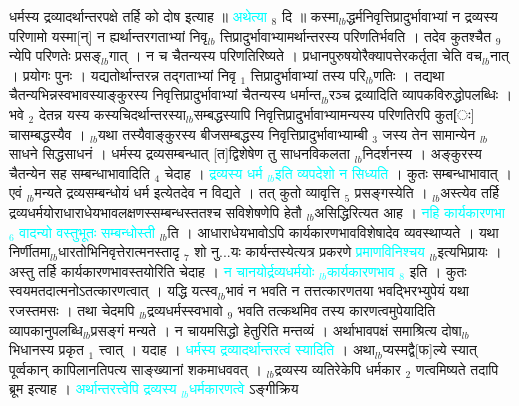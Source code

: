 \documentclass[article,12pt,a4paper]{memoir}%
\newcommand{\quotelemma}[1]{\textcolor{cyan}{#1}}
\begin{document}
	  
	  \pstart \leavevmode%
	\hphantom{.}धर्मस्य द्रव्यादर्थान्तरपक्षे तर्हि को दोष इत्याह ॥ \quotelemma{अथेत्या} \cite[5a9]{vn-msN} {\tiny $_{8}$} दि ॥ कस्मा{\tiny $_{lb}$}द्धर्मनिवृत्तिप्रादुर्भावाभ्यां न द्रव्यस्य परिणामो यस्मा[न्] न ह्यर्थान्तरगताभ्यां निवृ{\tiny $_{lb}$} \leavevmode{} त्तिप्रादुर्भावाभ्यामर्थान्तरस्य परिणतिर्भवति । तदेव कुतश्चैत {\tiny $_{9}$} \leavevmode{} न्येपि परिणतेः प्रसङ्{\tiny $_{lb}$}गात् । न च चैतन्यस्य परिणतिरिष्यते । प्रधानपुरुषयोरैक्यापत्तेरकर्तृता चेति वच{\tiny $_{lb}$}नात् । प्रयोगः पुनः । यद्यतोर्थान्तरन्न तद्गताभ्यां निवृ {\tiny $_{1}$} त्तिप्रादुर्भावाभ्यां तस्य परि{\tiny $_{lb}$}णतिः । तद्यथा चैतन्यभिन्नस्वभावस्याङ्कुरस्य निवृत्तिप्रादुर्भावाभ्यां चैतन्यस्य धर्मान्त{\tiny $_{lb}$}रञ्च द्रव्यादिति व्यापकविरुद्धोपलब्धिः । भवे {\tiny $_{2}$} देतन्न यस्य कस्यचिदर्थान्तरस्या{\tiny $_{lb}$}सम्बद्धस्यापि निवृत्तिप्रादुर्भावाभ्यामन्यस्य परिणतिरपि कुत[ः] चासम्बद्धस्यैव । {\tiny $_{lb}$}यथा तस्यैवाङ्कुरस्य बीजसम्बद्धस्य निवृत्तिप्रादुर्भावाभ्याम्बी {\tiny $_{3}$} जस्य तेन सामान्येन {\tiny $_{lb}$}साधने सिद्धसाधनं । धर्मस्य द्रव्यसम्बन्धात् [त]द्विशेषेण तु साधनविकलता {\tiny $_{lb}$}निदर्शनस्य । अङ्कुरस्य चैतन्येन सह सम्बन्धाभावादिति {\tiny $_{4}$} चेदाह । \quotelemma{द्रव्यस्य धर्म {\tiny $_{lb}$}इति \cite[5a10]{vn-msN} व्यपदेशो न सिध्यति} \cite[5a10]{vn-msN} । कुतः सम्बन्धाभावात् । एवं {\tiny $_{lb}$}मन्यते द्रव्यसम्बन्धोयं धर्म इत्येतदेव न विद्यते । तत् कुतो व्यावृत्ति {\tiny $_{5}$} प्रसङ्गस्येति । {\tiny $_{lb}$}अस्त्येव तर्हि द्रव्यधर्मयोराधाराधेयभावलक्षणस्सम्बन्धस्ततश्च सविशेषणेपि हेतौ {\tiny $_{lb}$}असिद्धिरित्यत आह । \quotelemma{नहि कार्यकारणभा {\tiny $_{6}$} वादन्यो वस्तुभूतः सम्बन्धोस्ती} \cite[5b1]{vn-msN} {\tiny $_{lb}$}ति । आधाराधेयभावोऽपि कार्यकारणभावविशेषादेव व्यवस्थाप्यते । यथा निर्णीतमा{\tiny $_{lb}$}धारतोभिनिवृत्तेरात्मनस्तादृ {\tiny $_{7}$} शो नु...यः कार्यन्तस्येत्यत्र प्रकरणे \quotelemma{प्रमाणविनिश्चय} {\tiny $_{lb}$}इत्यभिप्रायः । अस्तु तर्हि कार्यकारणभावस्तयोरिति चेदाह । \quotelemma{न चानयोर्द्रव्यधर्मयोः {\tiny $_{lb}$}कार्यकारणभाव {\tiny $_{8}$}} \cite[5b1]{vn-msN} इति । कुतः स्वयमतदात्मनोऽतत्कारणत्वात् । यद्धि यत्स्व{\tiny $_{lb}$}भावं न भवति न तत्तत्कारणतया भवद्भिरभ्युपेयं यथा रजस्तमसः । तथा चेदमपि {\tiny $_{lb}$}द्रव्यधर्मस्स्वभावो {\tiny $_{9}$} \leavevmode{} भवति तत्कथमिव तस्य कारणत्वमुपेयादिति व्यापकानुपलब्धि{\tiny $_{lb}$}प्रसङ्गं मन्यते । न चायमसिद्धो हेतुरिति मन्तव्यं । अर्थाभावपक्षं समाश्रित्य दोषा{\tiny $_{lb}$}भिधानस्य प्रकृत {\tiny $_{1}$} त्त्वात् । यदाह । \quotelemma{धर्मस्य द्रव्यादर्थान्तरत्वं \cite[5b1]{vn-msN} स्यादिति} । अथा{\tiny $_{lb}$}प्यस्मद्वै[फ]ल्ये स्यात् पूर्व्वकान् कापिलानतिपत्य साङ्ख्यानां शकमाधववत् । {\tiny $_{lb}$}द्रव्यस्य व्यतिरेकेपि धर्मकार {\tiny $_{2}$} णत्वमिष्यते तदापि ब्रूम इत्याह । \quotelemma{अर्थान्तरत्त्वेपि द्रव्यस्य {\tiny $_{lb}$}धर्मकारणत्वे} ऽङ्गीक्रिय 
\end{document}
